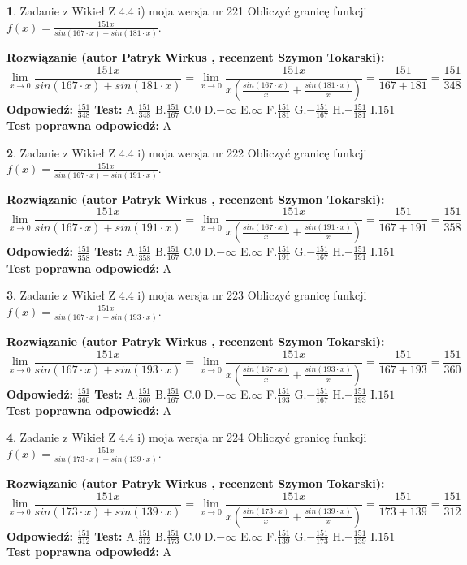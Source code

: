 \documentclass[12pt, a4paper]{article}
\theoremstyle{definition} %
\newtheorem{zad}{}
\newcommand{\zadStart}[1]{\begin{zad}#1\newline}
\newcommand{\zadStop}{\end{zad}}
\newcommand{\rozwStart}[2]{\noindent \textbf{Rozwiązanie (autor #1 , recenzent #2): }\newline}
\newcommand{\rozwStop}{\newline}
\newcommand{\odpStart}{\noindent \textbf{Odpowiedź:}\newline}
\newcommand{\odpStop}{\newline}
\newcommand{\testStart}{\noindent \textbf{Test:}\newline}
\newcommand{\testStop}{\newline}
\newcommand{\kluczStart}{\noindent \textbf{Test poprawna odpowiedź:}\newline}
\newcommand{\kluczStop}{\newline}
\begin{document}
\zadStart{Zadanie z Wikieł Z 4.4 i) moja wersja nr 221}
Obliczyć granicę funkcji $f(x)=\frac{151x}{sin(167\cdot x) +sin(181\cdot x)}$.
\zadStop
\rozwStart{Patryk Wirkus}{Szymon Tokarski}
$$\lim\limits_{x\to 0}\frac{151x}{sin(167\cdot x) +sin(181\cdot x)}=\lim\limits_{x\to 0}\frac{151x}{x(\frac{sin(167\cdot x)}{x}+\frac{sin(181\cdot x)}{x})}=\frac{151}{167+181} = \frac{151}{348}$$
\rozwStop
\odpStart
$\frac{151}{348}$
\odpStop
\testStart
A.$\frac{151}{348}$
B.$\frac{151}{167}$
C.$0$
D.$-\infty$
E.$\infty$
F.$\frac{151}{181}$
G.$-\frac{151}{167}$
H.$-\frac{151}{181}$
I.$151$
\testStop
\kluczStart
A
\kluczStop



\zadStart{Zadanie z Wikieł Z 4.4 i) moja wersja nr 222}
Obliczyć granicę funkcji $f(x)=\frac{151x}{sin(167\cdot x) +sin(191\cdot x)}$.
\zadStop
\rozwStart{Patryk Wirkus}{Szymon Tokarski}
$$\lim\limits_{x\to 0}\frac{151x}{sin(167\cdot x) +sin(191\cdot x)}=\lim\limits_{x\to 0}\frac{151x}{x(\frac{sin(167\cdot x)}{x}+\frac{sin(191\cdot x)}{x})}=\frac{151}{167+191} = \frac{151}{358}$$
\rozwStop
\odpStart
$\frac{151}{358}$
\odpStop
\testStart
A.$\frac{151}{358}$
B.$\frac{151}{167}$
C.$0$
D.$-\infty$
E.$\infty$
F.$\frac{151}{191}$
G.$-\frac{151}{167}$
H.$-\frac{151}{191}$
I.$151$
\testStop
\kluczStart
A
\kluczStop



\zadStart{Zadanie z Wikieł Z 4.4 i) moja wersja nr 223}
Obliczyć granicę funkcji $f(x)=\frac{151x}{sin(167\cdot x) +sin(193\cdot x)}$.
\zadStop
\rozwStart{Patryk Wirkus}{Szymon Tokarski}
$$\lim\limits_{x\to 0}\frac{151x}{sin(167\cdot x) +sin(193\cdot x)}=\lim\limits_{x\to 0}\frac{151x}{x(\frac{sin(167\cdot x)}{x}+\frac{sin(193\cdot x)}{x})}=\frac{151}{167+193} = \frac{151}{360}$$
\rozwStop
\odpStart
$\frac{151}{360}$
\odpStop
\testStart
A.$\frac{151}{360}$
B.$\frac{151}{167}$
C.$0$
D.$-\infty$
E.$\infty$
F.$\frac{151}{193}$
G.$-\frac{151}{167}$
H.$-\frac{151}{193}$
I.$151$
\testStop
\kluczStart
A
\kluczStop



\zadStart{Zadanie z Wikieł Z 4.4 i) moja wersja nr 224}
Obliczyć granicę funkcji $f(x)=\frac{151x}{sin(173\cdot x) +sin(139\cdot x)}$.
\zadStop
\rozwStart{Patryk Wirkus}{Szymon Tokarski}
$$\lim\limits_{x\to 0}\frac{151x}{sin(173\cdot x) +sin(139\cdot x)}=\lim\limits_{x\to 0}\frac{151x}{x(\frac{sin(173\cdot x)}{x}+\frac{sin(139\cdot x)}{x})}=\frac{151}{173+139} = \frac{151}{312}$$
\rozwStop
\odpStart
$\frac{151}{312}$
\odpStop
\testStart
A.$\frac{151}{312}$
B.$\frac{151}{173}$
C.$0$
D.$-\infty$
E.$\infty$
F.$\frac{151}{139}$
G.$-\frac{151}{173}$
H.$-\frac{151}{139}$
I.$151$
\testStop
\kluczStart
A
\kluczStop
\end{document}
